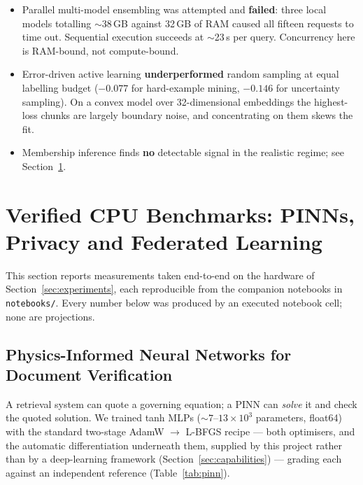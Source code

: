 \documentclass[11pt,a4paper]{article}
\theoremstyle{plain}
\theoremstyle{definition}
\begin{document}
\begin{itemize}
    \item Parallel multi-model ensembling was attempted and \textbf{failed}:
          three local models totalling $\sim$38\,GB against 32\,GB of RAM
          caused all fifteen requests to time out. Sequential execution
          succeeds at $\sim$23\,s per query. Concurrency here is RAM-bound,
          not compute-bound.
    \item Error-driven active learning \textbf{underperformed} random
          sampling at equal labelling budget ($-0.077$ for hard-example
          mining, $-0.146$ for uncertainty sampling). On a convex model over
          32-dimensional embeddings the highest-loss chunks are largely
          boundary noise, and concentrating on them skews the fit.
    \item Membership inference finds \textbf{no} detectable signal in the
          realistic regime; see Section~\ref{sec:verified}.
\end{itemize}

\section{Verified CPU Benchmarks: PINNs, Privacy and Federated Learning}
\label{sec:verified}

This section reports measurements taken end-to-end on the hardware of
Section~\ref{sec:experiments}, each reproducible from the companion notebooks
in \texttt{notebooks/}. Every number below was produced by an executed
notebook cell; none are projections.

\subsection{Physics-Informed Neural Networks for Document Verification}

A retrieval system can quote a governing equation; a PINN can \emph{solve} it
and check the quoted solution. We trained tanh MLPs
($\sim$$7$--$13\times10^{3}$ parameters, float64) with the standard two-stage
AdamW $\rightarrow$ L-BFGS recipe --- both optimisers, and the automatic
differentiation underneath them, supplied by this project rather than by a
deep-learning framework (Section~\ref{sec:capabilities}) --- grading each
against an independent reference (Table~\ref{tab:pinn}).
\end{document}
